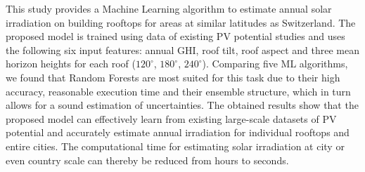 This study provides a Machine Learning algorithm to estimate annual solar irradiation on building rooftops for areas at similar latitudes as Switzerland. The proposed model is trained using data of existing PV potential studies and uses the following six input features: annual GHI, roof tilt, roof aspect and three mean horizon heights for each roof ($120^\circ$, $180^\circ$, $240^\circ$). Comparing five ML algorithms, we found that Random Forests are most suited for this task due to their high accuracy, reasonable execution time and their ensemble structure, which in turn allows for a sound estimation of uncertainties. The obtained results show that the proposed model can effectively learn from existing large-scale datasets of PV potential and accurately estimate annual irradiation for individual rooftops and entire cities. The computational time for estimating solar irradiation at city or even country scale can thereby be reduced from hours to seconds.
